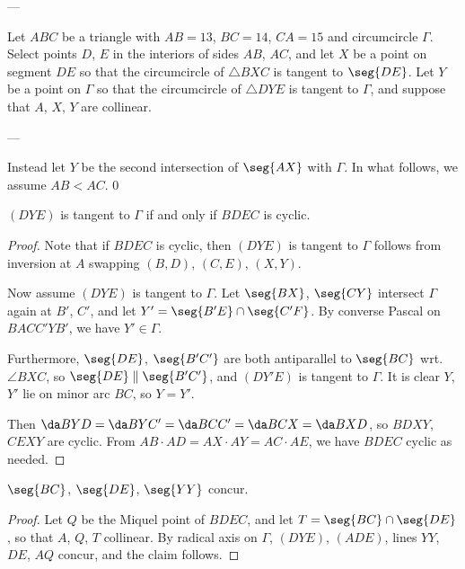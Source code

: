 
---

Let $ABC$ be a triangle with $AB=13$, $BC=14$, $CA=15$ and circumcircle $\Gamma$. Select points $D$, $E$ in the interiors of sides $AB$, $AC$, and let $X$ be a point on segment $DE$ so that the circumcircle of $\triangle BXC$ is tangent to $\seg{DE}$. Let $Y$ be a point on $\Gamma$ so that the circumcircle of $\triangle DYE$ is tangent to $\Gamma$, and suppose that $A$, $X$, $Y$ are collinear.

---

Instead let $Y$ be the second intersection of $\seg{AX}$ with $\Gamma$. In what follows, we assume $AB<AC$.
\setcounter{claim}0
\begin{claim}
    $(DYE)$ is tangent to $\Gamma$ if and only if $BDEC$ is cyclic.
\end{claim}
\begin{proof}
    Note that if $BDEC$ is cyclic, then $(DYE)$ is tangent to $\Gamma$ follows from inversion at $A$ swapping $(B,D)$, $(C,E)$, $(X,Y)$.

    Now assume $(DYE)$ is tangent to $\Gamma$. Let $\seg{BX}$, $\seg{CY}$ intersect $\Gamma$ again at $B'$, $C'$, and let $Y'=\seg{B'E}\cap\seg{C'F}$. By converse Pascal on $BACC'YB'$, we have $Y'\in\Gamma$.

    Furthermore, $\seg{DE}$, $\seg{B'C'}$ are both antiparallel to $\seg{BC}$ wrt.\ $\angle BXC$, so $\seg{DE}\parallel\seg{B'C'}$, and $(DY'E)$ is tangent to $\Gamma$. It is clear $Y$, $Y'$ lie on minor arc $BC$, so $Y=Y'$.

    Then $\da BYD=\da BYC'=\da BCC'=\da BCX=\da BXD$, so $BDXY$, $CEXY$ are cyclic. From $AB\cdot AD=AX\cdot AY=AC\cdot AE$, we have $BDEC$ cyclic as needed.
\end{proof}
\begin{claim}
    $\seg{BC}$, $\seg{DE}$, $\seg{YY}$ concur.
\end{claim}
\begin{proof}
    Let $Q$ be the Miquel point of $BDEC$, and let $T=\seg{BC}\cap\seg{DE}$, so that $A$, $Q$, $T$ collinear. By radical axis on $\Gamma$, $(DYE)$, $(ADE)$, lines $YY$, $DE$, $AQ$ concur, and the claim follows.
\end{proof}
